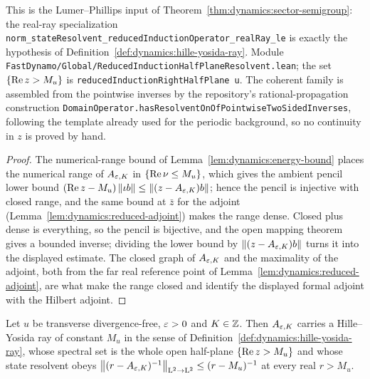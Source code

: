 This is the Lumer--Phillips input of Theorem~\ref{thm:dynamics:sector-semigroup}: the real-ray
specialization \texttt{norm\_stateResolvent\_reducedInductionOperator\_realRay\_le} is
exactly the hypothesis of Definition~\ref{def:dynamics:hille-yosida-ray}.  Module
\texttt{FastDynamo/Global/ReducedInductionHalfPlaneResolvent.lean}; the set
$\{\operatorname{Re} z>M_u\} $ is \texttt{reducedInductionRightHalfPlane u}.  The coherent family is
assembled from the pointwise inverses by the repository's rational-propagation construction
\texttt{DomainOperator.hasResolventOnOfPointwiseTwoSidedInverses}, following the template
already used for the periodic background, so no continuity in $z $ is proved by hand.

\begin{proof}
  \leanok
  The numerical-range bound of Lemma~\ref{lem:dynamics:energy-bound} places the numerical
  range of $A_{\varepsilon,K} $ in $\{\operatorname{Re}\nu\leq M_u\} $, which gives the ambient pencil lower
  bound $(\operatorname{Re} z-M_u)\left\|\iota b\right\|\leq\left\|(z-A_{\varepsilon,K})b\right\| $; hence the pencil is injective
  with closed range, and the same bound at $\bar z $ for the adjoint
  (Lemma~\ref{lem:dynamics:reduced-adjoint}) makes the range dense.  Closed plus dense is
  everything, so the pencil is bijective, and the open mapping theorem gives a bounded
  inverse; dividing the lower bound by $\left\|(z-A_{\varepsilon,K})b\right\| $ turns it into the displayed
  estimate.  The closed graph of $A_{\varepsilon,K} $ and the maximality of the adjoint, both from
  the far real reference point of Lemma~\ref{lem:dynamics:reduced-adjoint}, are what make
  the range closed and identify the displayed formal adjoint with the Hilbert adjoint.
\end{proof}

\begin{theorem}
  \label{thm:dynamics:sector-semigroup}
  \leanok
  Let $u $ be transverse divergence-free, $\varepsilon>0 $ and $K\in\mathbb{Z} $.  Then $A_{\varepsilon,K} $
  carries a Hille--Yosida ray of constant $M_u $ in the sense of
  Definition~\ref{def:dynamics:hille-yosida-ray}, whose spectral set is the whole open
  half-plane $\{\operatorname{Re} z>M_u\} $ and whose state resolvent obeys
  $\left\|(r-A_{\varepsilon,K})^{-1}\right\|_{\mathrm{L}^2\to\mathrm{L}^2}\leq(r-M_u)^{-1} $ at every real $r>M_u $.
\end{theorem}

